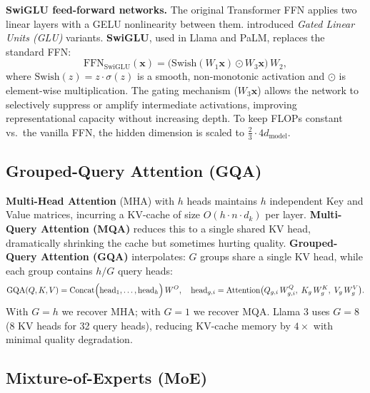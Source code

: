 \documentclass[11pt,a4paper]{article}
\begin{document}
	\textbf{SwiGLU feed-forward networks.} The original Transformer FFN applies two linear layers with a GELU nonlinearity between them. \textcite{shazeer2020glu} introduced \emph{Gated Linear Units (GLU)} variants. \textbf{SwiGLU}, used in Llama and PaLM, replaces the standard FFN:
	\begin{equation}
		\mathrm{FFN}_{\mathrm{SwiGLU}}(\mathbf{x}) = \bigl(\mathrm{Swish}(W_1 \mathbf{x}) \odot W_3 \mathbf{x}\bigr)\,W_2,
	\end{equation}
	where $\mathrm{Swish}(z) = z \cdot \sigma(z)$ is a smooth, non-monotonic activation and $\odot$ is element-wise multiplication. The gating mechanism ($W_3\mathbf{x}$) allows the network to selectively suppress or amplify intermediate activations, improving representational capacity without increasing depth. To keep FLOPs constant vs.\ the vanilla FFN, the hidden dimension is scaled to $\frac{2}{3} \cdot 4d_{\mathrm{model}}$.

	\subsection{Grouped-Query Attention (GQA)}

	\textbf{Multi-Head Attention} (MHA) with $h$ heads maintains $h$ independent Key and Value matrices, incurring a KV-cache of size $O(h \cdot n \cdot d_k)$ per layer. \textbf{Multi-Query Attention (MQA)} reduces this to a single shared KV head, dramatically shrinking the cache but sometimes hurting quality. \textbf{Grouped-Query Attention (GQA)} \parencite{ainslie2023gqa} interpolates: $G$ groups share a single KV head, while each group contains $h/G$ query heads:
	\begin{equation}
		\mathrm{GQA}(Q, K, V) = \mathrm{Concat}\Bigl(\mathrm{head}_1, \ldots, \mathrm{head}_h\Bigr)\,W^O,
		\quad \mathrm{head}_{g,i} = \mathrm{Attention}\bigl(Q_{g,i}\,W^Q_{g,i},\; K_g\,W^K_g,\; V_g\,W^V_g\bigr).
	\end{equation}
	With $G = h$ we recover MHA; with $G = 1$ we recover MQA. Llama 3 uses $G = 8$ (8 KV heads for 32 query heads), reducing KV-cache memory by $4\times$ with minimal quality degradation.

	\subsection{Mixture-of-Experts (MoE)}
\end{document}
